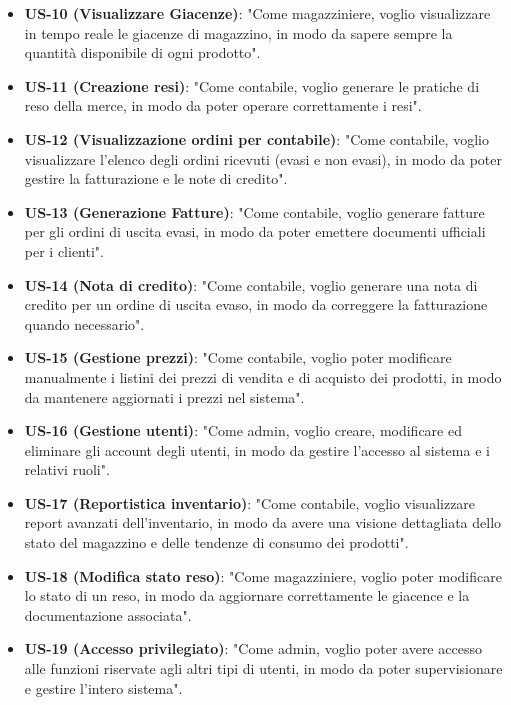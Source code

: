 \documentclass[a4paper,12pt]{article}
\begin{document}
\begin{itemize}
    \item \textbf{US-10 (Visualizzare Giacenze)}: "Come magazziniere, voglio visualizzare in tempo reale le giacenze di magazzino, in modo da sapere sempre la quantità disponibile di ogni prodotto".
    \item \textbf{US-11 (Creazione resi)}: "Come contabile, voglio generare le pratiche di reso della merce, in modo da poter operare correttamente i resi".
    \item \textbf{US-12 (Visualizzazione ordini per contabile)}: "Come contabile, voglio visualizzare l'elenco degli ordini ricevuti (evasi e non evasi), in modo da poter gestire la fatturazione e le note di credito".
    \item \textbf{US-13 (Generazione Fatture)}: "Come contabile, voglio generare fatture per gli ordini di uscita evasi, in modo da poter emettere documenti ufficiali per i clienti".
    \item \textbf{US-14 (Nota di credito)}: "Come contabile, voglio generare una nota di credito per un ordine di uscita evaso, in modo da correggere la fatturazione quando necessario".
    \item \textbf{US-15 (Gestione prezzi)}: "Come contabile, voglio poter modificare manualmente i listini dei prezzi di vendita e di acquisto dei prodotti, in modo da mantenere aggiornati i prezzi nel sistema".
    \item \textbf{US-16 (Gestione utenti)}: "Come admin, voglio creare, modificare ed eliminare gli account degli utenti, in modo da gestire l'accesso al sistema e i relativi ruoli".
    \item \textbf{US-17 (Reportistica inventario)}: "Come contabile, voglio visualizzare report avanzati dell'inventario, in modo da avere una visione dettagliata dello stato del magazzino e delle tendenze di consumo dei prodotti".
    \item \textbf{US-18 (Modifica stato reso)}: "Come magazziniere, voglio poter modificare lo stato di un reso, in modo da aggiornare correttamente le giacence e la documentazione associata".
    \item \textbf{US-19 (Accesso privilegiato)}: "Come admin, voglio poter avere accesso alle funzioni riservate agli altri tipi di utenti, in modo da poter supervisionare e gestire l'intero sistema".
\end{itemize}

\end{document}
